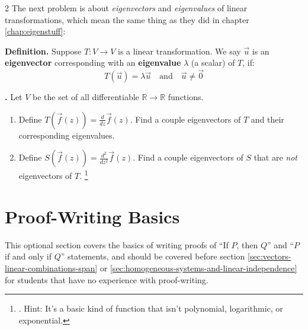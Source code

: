 \documentclass[11pt, letterpaper]{report}
\newcounter{exercise}[section]
\newcommand{\exatend}{\refstepcounter{exercise}\par%
\noindent\textbf{\theexercise.} }
\newenvironment{definition}{\begin{bbox}\par\noindent\textbf{Definition. }}
  {\end{bbox}}
\newcommand{\hintfootnote}[1]{%
\begingroup
\renewcommand{\thefootnote}{H}%
\footnote{\theexercise. Hint: #1}%
\endgroup}
\newlength\oldfboxsep%
\newlength\myminiwidth%
\newenvironment{bbox}{%
  \setlength\oldfboxsep\fboxsep
  \setlength{\fboxsep}{.1in}%
  \setlength\myminiwidth\linewidth%
  \addtolength\myminiwidth{-0.2in}%
  \vspace{0.1in}%
  \begin{lrbox}{\bboxbox}\begin{minipage}{\myminiwidth}%
    }{%
    \end{minipage}\end{lrbox}%
  \noindent\fbox{\usebox{\bboxbox}}\vspace{0.1in}\setlength\fboxsep\oldfboxsep%
}
\newcommand{\R}{\mathbb{R}}
\begin{document}
\begin{multicols*}{2}
The next problem is about \emph{eigenvectors} and \emph{eigenvalues} of linear transformations, which mean the same thing as they did in chapter \ref{chap:eigenstuff}:

\begin{definition}
Suppose $T:V\rightarrow V$ is a linear transformation. We say $\vec{u}$ is an \textbf{eigenvector} corresponding with an \textbf{eigenvalue} $\lambda$ (a scalar) of $T$, if:
\[T(\vec{u})=\lambda \vec{u} \quad \text{and} \quad \vec{u}\ne\vec{0}\]
\end{definition}

\exatend \label{exercise:7.2-29} Let $V$ be the set of all differentiable $\R \rightarrow \R$ functions.
\begin{enumerate}[label=(\alph*)]
\item Define $T(\vec{f}(z)) = \frac{d}{dz}\vec{f}(z)$. Find a couple eigenvectors of $T$ and their corresponding eigenvalues.
\item Define $S(\vec{f}(z)) = \frac{d^2}{dz^2}\vec{f}(z)$. Find a couple eigenvectors of $S$ that are \emph{not} eigenvectors of $T$. \hintfootnote{It's a basic kind of function that isn't polynomial, logarithmic, or exponential.}
\end{enumerate}

\end{multicols*}


\appendix
\chapter{Proof-Writing Basics}


This optional section covers the basics of writing proofs of ``If $P$, then $Q$'' and ``$P$ if and only if $Q$'' statements, and should be covered before section \ref{sec:vectors-linear-combinations-span} or \ref{sec:homogeneous-systems-and-linear-independence} for students that have no experience with proof-writing.
\end{document}
